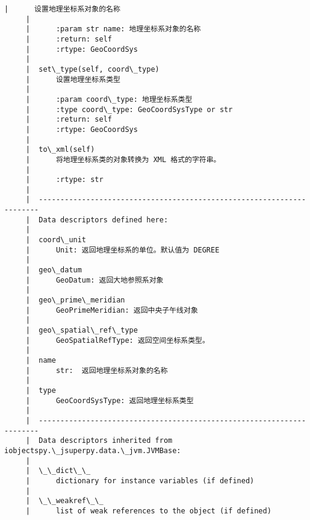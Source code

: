 \documentclass[11pt]{article}
\begin{document}
\begin{Verbatim}[commandchars=\\\{\}]
     |      设置地理坐标系对象的名称
     |      
     |      :param str name: 地理坐标系对象的名称
     |      :return: self
     |      :rtype: GeoCoordSys
     |  
     |  set\_type(self, coord\_type)
     |      设置地理坐标系类型
     |      
     |      :param coord\_type: 地理坐标系类型
     |      :type coord\_type: GeoCoordSysType or str
     |      :return: self
     |      :rtype: GeoCoordSys
     |  
     |  to\_xml(self)
     |      将地理坐标系类的对象转换为 XML 格式的字符串。
     |      
     |      :rtype: str
     |  
     |  ----------------------------------------------------------------------
     |  Data descriptors defined here:
     |  
     |  coord\_unit
     |      Unit: 返回地理坐标系的单位。默认值为 DEGREE
     |  
     |  geo\_datum
     |      GeoDatum: 返回大地参照系对象
     |  
     |  geo\_prime\_meridian
     |      GeoPrimeMeridian: 返回中央子午线对象
     |  
     |  geo\_spatial\_ref\_type
     |      GeoSpatialRefType: 返回空间坐标系类型。
     |  
     |  name
     |      str:  返回地理坐标系对象的名称
     |  
     |  type
     |      GeoCoordSysType: 返回地理坐标系类型
     |  
     |  ----------------------------------------------------------------------
     |  Data descriptors inherited from iobjectspy.\_jsuperpy.data.\_jvm.JVMBase:
     |  
     |  \_\_dict\_\_
     |      dictionary for instance variables (if defined)
     |  
     |  \_\_weakref\_\_
     |      list of weak references to the object (if defined)
    

\end{Verbatim}
\end{document}
